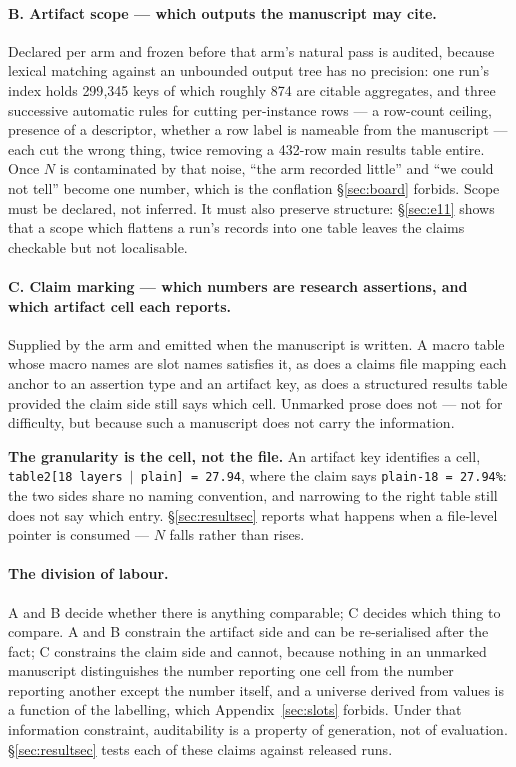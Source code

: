 \documentclass[10pt]{article}
\newcommand{\RM}[1]{{#1}}
\begin{document}
\paragraph{B. Artifact scope --- which outputs the manuscript may cite.}
Declared per arm and frozen before that arm's natural pass is audited, because
lexical matching against an unbounded output tree has no precision: one run's
index holds \RM{299{,}345} keys of which roughly \RM{874} are citable
aggregates, and three successive automatic rules for cutting per-instance rows
--- a row-count ceiling, presence of a descriptor, whether a row label is
nameable from the manuscript --- each cut the wrong thing, twice removing a
\RM{432}-row main results table entire. Once $N$ is contaminated by that noise,
``the arm recorded little'' and ``we could not tell'' become one number, which
is the conflation \S\ref{sec:board} forbids. Scope must be declared, not
inferred. It must also preserve structure: \S\ref{sec:e11} shows that a scope
which flattens a run's records into one table leaves the claims checkable but
not localisable.

\paragraph{C. Claim marking --- which numbers are research assertions, and which
artifact cell each reports.} Supplied by the arm and emitted when the manuscript
is written. A macro table whose macro names are slot names satisfies it, as does
a claims file mapping each anchor to an assertion type and an artifact key, as
does a structured results table provided the claim side still says which cell.
Unmarked prose does not --- not for difficulty, but because such a manuscript
does not carry the information.

\textbf{The granularity is the cell, not the file.} An artifact key identifies a
cell, \texttt{table2[18~layers\,$\vert$\,plain]\,=\,27.94}, where the claim says
\texttt{plain-18\,=\,27.94\%}: the two sides share no naming convention, and
narrowing to the right table still does not say which entry.
\S\ref{sec:resultsec} reports what happens when a file-level pointer is
consumed --- $N$ falls rather than rises.

\paragraph{The division of labour.} A and B decide whether there is anything
comparable; C decides which thing to compare. A and B constrain the artifact
side and can be re-serialised after the fact; C constrains the claim side and
cannot, because nothing in an unmarked manuscript distinguishes the number
reporting one cell from the number reporting another except the number itself,
and a universe derived from values is a function of the labelling, which
Appendix~\ref{sec:slots} forbids. Under that information constraint, auditability is a property of generation,
not of evaluation. \S\ref{sec:resultsec} tests each of these claims against
released runs.
\end{document}
